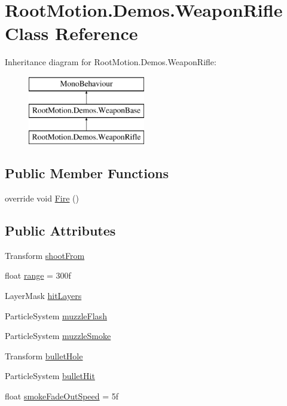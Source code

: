 \hypertarget{class_root_motion_1_1_demos_1_1_weapon_rifle}{}\section{Root\+Motion.\+Demos.\+Weapon\+Rifle Class Reference}
\label{class_root_motion_1_1_demos_1_1_weapon_rifle}
Inheritance diagram for Root\+Motion.\+Demos.\+Weapon\+Rifle\+:\begin{figure}[H]
\begin{center}
\leavevmode
\includegraphics[height=3.000000cm]{class_root_motion_1_1_demos_1_1_weapon_rifle}
\end{center}
\end{figure}
\subsection*{Public Member Functions}
\begin{DoxyCompactItemize}
\item 
override void \mbox{\hyperlink{class_root_motion_1_1_demos_1_1_weapon_rifle_addde8b0d4aa215578c749c96c58b702c}{Fire}} ()
\end{DoxyCompactItemize}
\subsection*{Public Attributes}
\begin{DoxyCompactItemize}
\item 
Transform \mbox{\hyperlink{class_root_motion_1_1_demos_1_1_weapon_rifle_adbd915bbe8dd3274a7c3ca58b592920c}{shoot\+From}}
\item 
float \mbox{\hyperlink{class_root_motion_1_1_demos_1_1_weapon_rifle_ac93d48090cfbc636f8061be71f7a5374}{range}} = 300f
\item 
Layer\+Mask \mbox{\hyperlink{class_root_motion_1_1_demos_1_1_weapon_rifle_a7c0dcd948b833eb85c31e2760ecd4037}{hit\+Layers}}
\item 
Particle\+System \mbox{\hyperlink{class_root_motion_1_1_demos_1_1_weapon_rifle_a67d3e2df71a1719f255045eb4c1c204c}{muzzle\+Flash}}
\item 
Particle\+System \mbox{\hyperlink{class_root_motion_1_1_demos_1_1_weapon_rifle_a0bd40857a973bed17f863841c36de711}{muzzle\+Smoke}}
\item 
Transform \mbox{\hyperlink{class_root_motion_1_1_demos_1_1_weapon_rifle_aa40e5186efb28a0d30060b3bfd00a30d}{bullet\+Hole}}
\item 
Particle\+System \mbox{\hyperlink{class_root_motion_1_1_demos_1_1_weapon_rifle_a162f22cba9940d8892e9d00454a89c84}{bullet\+Hit}}
\item 
float \mbox{\hyperlink{class_root_motion_1_1_demos_1_1_weapon_rifle_a7b8b3da1883717e3ce72c46920168044}{smoke\+Fade\+Out\+Speed}} = 5f
\end{DoxyCompactItemize}


